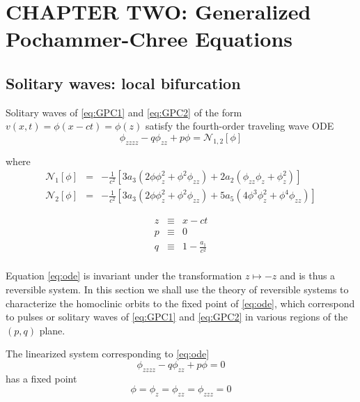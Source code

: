 \chapter{CHAPTER TWO: Generalized Pochammer-Chree Equations} \label{chapter_2}


\section{Solitary waves: local bifurcation}

Solitary waves of \eqref{eq:GPC1} and \eqref{eq:GPC2} of the form 
$v(x,t) = \phi\left(x - c t\right) = \phi\left(z\right)$
 satisfy the fourth-order traveling wave ODE
\begin{equation} \label{eq:ode} \phi_{zzzz} - q \phi_{zz} + p \phi = \mathcal{N}_{1,2}[\phi]
\end{equation}

where 
\begin{subequations}
\begin{eqnarray}
\mathcal{N}_1\left[\phi\right] &=& - \frac{1}{c^2}\left[  3 a_3 \left( 2 \phi \phi_z^2 + \phi^2 \phi_{zz} \right) + 2 a_2\left( \phi_{zz} \phi_z + \phi_z^2\right) \right] \\
\mathcal{N}_2\left[\phi\right] &=& - \frac{1}{c^2}\left[ 3 a_3 \left( 2 \phi \phi_z^2 + \phi^2 \phi_{zz}\right) + 5 a_5 \left( 4 \phi^3 \phi_z^2 + \phi^4 \phi_{zz} \right) \right]
\end{eqnarray}
\end{subequations}

\begin{subequations}
\begin{eqnarray}
z &\equiv& x - c t\\
p &\equiv& 0\label{eq:pdef} \\
q &\equiv & 1 - \frac{a_1}{c^2} \label{eq:qdef} \\
\end{eqnarray}
\end{subequations}

Equation \eqref{eq:ode} is invariant under the transformation $ z \mapsto -z $ and is thus a reversible system. In this section we shall
use the theory of reversible systems to characterize the homoclinic orbits to the fixed point of \eqref{eq:ode}, which correspond to pulses
or solitary waves of \eqref{eq:GPC1} and \eqref{eq:GPC2} in various regions of the $(p,q)$ plane.

The linearized system corresponding to \eqref{eq:ode}
\begin{equation}
 \label{eq:linode} \phi_{zzzz} - q \phi_{zz} + p \phi = 0
\end{equation}
has a fixed point \begin{equation}\label{eq:fp} \phi = \phi_z = \phi_{zz} = \phi_{zzz} = 0 \end{equation}


